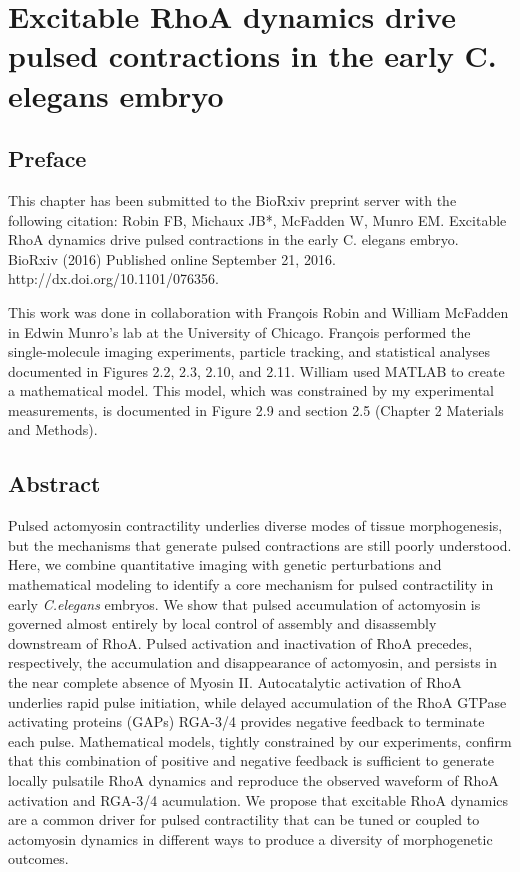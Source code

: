 \documentclass{ucetd}
\begin{document}
\chapter{Excitable RhoA dynamics drive pulsed contractions in the early C. elegans embryo}

\section{Preface}
This chapter has been submitted to the BioRxiv preprint server with the following citation: Robin FB, Michaux JB*, McFadden W, Munro EM.  Excitable RhoA dynamics drive pulsed contractions in the early C. elegans embryo.  BioRxiv (2016) Published online September 21, 2016. http://dx.doi.org/10.1101/076356.


This work was done in collaboration with Fran\c{c}ois Robin and William McFadden in Edwin Munro's lab at the University of Chicago.  Fran\c{c}ois performed the single-molecule imaging experiments, particle tracking, and statistical analyses documented in Figures 2.2, 2.3, 2.10, and 2.11.  William used MATLAB to create a mathematical model.  This model, which was constrained by my experimental measurements, is documented in Figure 2.9 and section 2.5 (Chapter 2 Materials and Methods).

\section{Abstract}
Pulsed actomyosin contractility underlies diverse modes of tissue morphogenesis, but the mechanisms that generate pulsed contractions are still poorly understood.  Here, we combine quantitative imaging with genetic perturbations and mathematical modeling to identify a core mechanism for pulsed contractility in early \textit{C.elegans} embryos.  We show that pulsed accumulation of actomyosin is governed almost entirely by local control of assembly and disassembly downstream of RhoA.  Pulsed activation and inactivation of RhoA precedes, respectively, the accumulation and disappearance of actomyosin, and persists in the near complete absence of Myosin II.  Autocatalytic activation of RhoA underlies rapid pulse initiation, while delayed accumulation of the RhoA GTPase activating proteins (GAPs) RGA-3/4 provides negative feedback to terminate each pulse. Mathematical models, tightly constrained by our experiments, confirm that this combination of positive and negative feedback is sufficient to generate locally pulsatile RhoA dynamics and reproduce the observed waveform of RhoA activation and RGA-3/4 acumulation. We propose that excitable RhoA dynamics are a common driver for pulsed contractility that can be tuned or coupled to actomyosin dynamics in different ways to produce a diversity of morphogenetic outcomes.
\end{document}

